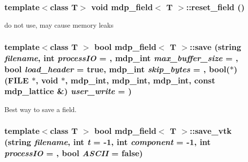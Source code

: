 \label{classmdp__field_a0f6da321ba9bdae3a571dbbe5087d799}
\hypertarget{classmdp__field_aa581ac8278d31ed9dabbff2df49c7130}{
\subsubsection[{reset\_\-field}]{\setlength{\rightskip}{0pt plus 5cm}template$<$class T$>$ void {\bf mdp\_\-field}$<$ T $>$::reset\_\-field ()}}
\label{classmdp__field_aa581ac8278d31ed9dabbff2df49c7130}


do not use, may cause memory leaks \hypertarget{classmdp__field_a66bbe9d66cc3ad2a5955282df3519471}{
\subsubsection[{save}]{\setlength{\rightskip}{0pt plus 5cm}template$<$class T $>$ bool {\bf mdp\_\-field}$<$ T $>$::save (string {\em filename}, \/  int {\em processIO} = {}, \/  {\bf mdp\_\-int} {\em max\_\-buffer\_\-size} = {}, \/  bool {\em load\_\-header} = {\ttfamily true}, \/  {\bf mdp\_\-int} {\em skip\_\-bytes} = {}, \/  bool($\ast$)(FILE $\ast$, void $\ast$, {\bf mdp\_\-int}, {\bf mdp\_\-int}, {\bf mdp\_\-int}, const {\bf mdp\_\-lattice} \&) {\em user\_\-write} = {})}}
\label{classmdp__field_a66bbe9d66cc3ad2a5955282df3519471}


Best way to save a field. \hypertarget{classmdp__field_a8ad4d41e9c53df910f114031f84e0845}{
\subsubsection[{save\_\-vtk}]{\setlength{\rightskip}{0pt plus 5cm}template$<$class T $>$ bool {\bf mdp\_\-field}$<$ T $>$::save\_\-vtk (string {\em filename}, \/  int {\em t} = {\ttfamily -\/1}, \/  int {\em component} = {\ttfamily -\/1}, \/  int {\em processIO} = {}, \/  bool {\em ASCII} = {\ttfamily false})}}
\label{classmdp__field_a8ad4d41e9c53df910f114031f84e0845}


